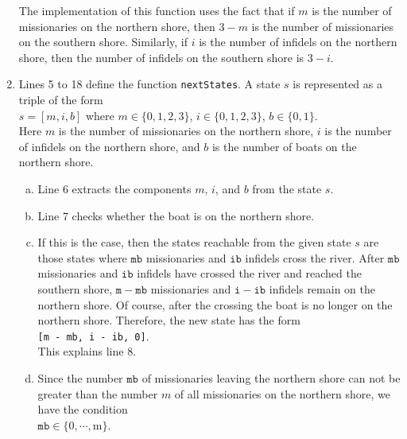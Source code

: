 \begin{enumerate}
      The implementation of this function uses the fact that if $m$ is the number of missionaries on
      the northern shore, then $3-m$ is the number of missionaries on the southern shore.  Similarly,
      if $i$ is the number of infidels on the northern shore, then the number of infidels on the
      southern shore is $3 - i$.
\item Lines 5 to 18 define the function \texttt{nextStates}.  A state $s$ is represented as a triple of
      the form
      \\[0.2cm]
      \hspace*{1.3cm}
      $s = [m, i, b]$ \quad where $m \in \{0,1,2,3\}$, $i \in \{0,1,2,3\}$, $b \in\{0,1\}$.
      \\[0.2cm]
      Here $m$ is the number of missionaries on the northern shore, $i$ is the number of infidels on
      the northern shore, and $b$ is the number of boats on the northern shore.
      \begin{enumerate}[(a)]
      \item Line 6 extracts the components $m$, $i$, and $b$ from the state $s$.
      \item Line 7 checks whether the boat is on the northern shore.
      \item If this is the case,  then the states reachable from the given state $s$ are those
            states where $\mathtt{mb}$ missionaries and $\mathtt{ib}$ infidels cross the river.
            After $\mathtt{mb}$ missionaries and $\mathtt{ib}$ infidels have crossed the river and
            reached the southern shore, $\mathtt{m} - \mathtt{mb}$ missionaries and $\mathtt{i} - \mathtt{ib}$ infidels
            remain on the northern shore.  Of course, after the crossing the boat is no longer on the
            northern shore.  Therefore, the new state has the form
            \\[0.2cm]
            \hspace*{1.3cm}
            \texttt{[m - mb, i - ib, 0]}.
            \\[0.2cm]
            This explains line 8.
      \item Since the number $\mathtt{mb}$ of missionaries leaving the northern shore can not be greater
            than the number $m$ of all missionaries on the northern shore, we have the condition
            \\[0.2cm]
            \hspace*{1.3cm}
            $\mathtt{mb} \in \{0,\cdots,\mathrm{m}\}$.
            \\[0.2cm]

\end{enumerate}
\end{enumerate}
